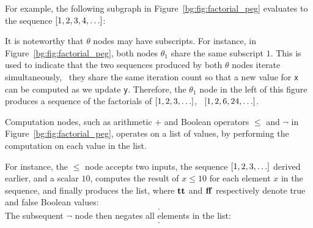 For example, the following subgraph in Figure~\ref{bg:fig:factorial_peg}
evaluates to the sequence $[1, 2, 3, 4, \mathellipsis]$:
\begin{center}
    \vspace{-16.5pt}
    \vspace{-16.5pt}
\end{center}

It is noteworthy that $\theta$ nodes may have subscripts.  For instance,
in Figure~\ref{bg:fig:factorial_peg}, both nodes $\theta_1$ share the same
subscript $1$.  This is used to indicate that the two sequences produced
by both $\theta$ nodes iterate simultaneously, \ie~they share the same
iteration count so that a new value for \verb|x| can be computed as we update
\verb|y|.  Therefore, the $\theta_1$ node in the left of this figure produces
a sequence of the factorials of $[1, 2, 3, \mathellipsis]$, \ie~$[1, 2, 6, 24,
\mathellipsis]$.

Computation nodes, such as arithmetic $+$ and Boolean operators $\leq$ and
$\neg$ in Figure~\ref{bg:fig:factorial_peg}, operates on a list of values, by
performing the computation on each value in the list.

For instance, the $\leq$ node accepts two inputs, the sequence $[1, 2, 3,
\mathellipsis]$ derived earlier, and a scalar $10$, computes the result of $x
\leq 10$ for each element $x$ in the sequence, and finally produces the list,
where $\mathbf{tt}$ and $\mathbf{ff}$ respectively denote true and false Boolean
values:
\begin{equation}
    [
        \truelit, \truelit, \truelit, \truelit, \truelit,
        \truelit, \truelit, \truelit, \truelit, \truelit,
        \falselit, \falselit, \falselit, \mathellipsis
    ].
\end{equation}
The subsequent $\neg$ node then negates all elements in the list:
\begin{equation}
    [
        \falselit, \falselit, \falselit, \falselit, \falselit,
        \falselit, \falselit, \falselit, \falselit, \falselit,
        \truelit, \truelit, \truelit, \mathellipsis
    ].
    \label{bg:eq:bool_seq}
\end{equation}

